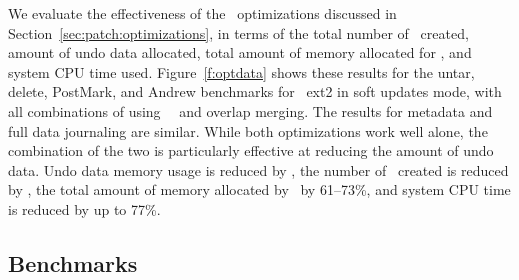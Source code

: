 \opttable{}

We evaluate the effectiveness of the \patch\ optimizations discussed in
Section~\ref{sec:patch:optimizations}, in terms of
%
the total number of \patches\ created, amount of undo data allocated,
total amount of memory allocated for \Kudos, and system CPU time used.
%
Figure~\ref{f:optdata} shows these results for the untar, delete,
PostMark, and Andrew benchmarks for \Kudos\ ext2 in soft updates mode,
with all combinations of using \nrb\ \patches\ and overlap merging.
The results for metadata and full data journaling are similar.
%
While both optimizations work well alone, the combination of the two
is particularly effective at reducing the amount of undo data.
%
Undo data memory usage is reduced by \patchoptundo,
%
the number of \patches\ created is reduced by \patchoptcount,
%
the total amount of memory allocated by \Kudos\ by 61--73\%,
%
and system CPU time is reduced by up to 77\%.

\begin{comment}
\begin{figure}[t]
\vspace{-0.5\baselineskip}
\centering{
\texttt{[image: rb\_patch\_size]}
}
\vspace{-0.5\baselineskip}
\caption{\label{fig:patchsize-histo} \Rb\ \patch\ size histogram for a sample
workload (extracting a large archive into ext2). All the \patches\ larger than
63 bytes have been optimized into \nrb\ \patches. \Rb\ \patches\ 4 bytes and
smaller account for about 51\% of all \rb\ \patches.}
\end{figure}
\end{comment}

\subsection {Benchmarks}
\label{sec:eval:bench}

\newcommand{\safe}[1]{\textbf{#1}}
\newcommand{\unsafe}[1]{#1}

